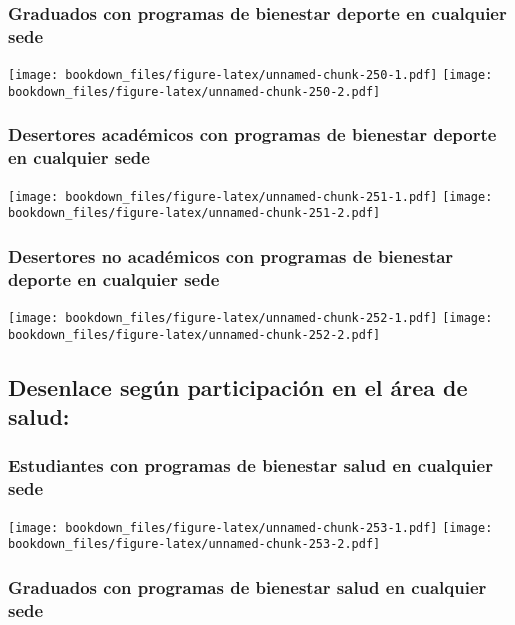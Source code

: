 \documentclass[]{article}
\theoremstyle{definition}
\theoremstyle{definition}
\theoremstyle{definition}
\theoremstyle{remark}
\begin{document}
\subsubsection{Graduados con programas de bienestar deporte en cualquier
sede}\label{graduados-con-programas-de-bienestar-deporte-en-cualquier-sede-1}

\texttt{[image: bookdown\_files/figure-latex/unnamed-chunk-250-1.pdf]}
\texttt{[image: bookdown\_files/figure-latex/unnamed-chunk-250-2.pdf]}

\subsubsection{Desertores académicos con programas de bienestar deporte
en cualquier
sede}\label{desertores-academicos-con-programas-de-bienestar-deporte-en-cualquier-sede-1}

\texttt{[image: bookdown\_files/figure-latex/unnamed-chunk-251-1.pdf]}
\texttt{[image: bookdown\_files/figure-latex/unnamed-chunk-251-2.pdf]}

\subsubsection{Desertores no académicos con programas de bienestar
deporte en cualquier
sede}\label{desertores-no-academicos-con-programas-de-bienestar-deporte-en-cualquier-sede-1}

\texttt{[image: bookdown\_files/figure-latex/unnamed-chunk-252-1.pdf]}
\texttt{[image: bookdown\_files/figure-latex/unnamed-chunk-252-2.pdf]}

\subsection{Desenlace según participación en el área de
salud:}\label{desenlace-segun-participacion-en-el-area-de-salud-2}

\subsubsection{Estudiantes con programas de bienestar salud en cualquier
sede}\label{estudiantes-con-programas-de-bienestar-salud-en-cualquier-sede-3}

\texttt{[image: bookdown\_files/figure-latex/unnamed-chunk-253-1.pdf]}
\texttt{[image: bookdown\_files/figure-latex/unnamed-chunk-253-2.pdf]}

\subsubsection{Graduados con programas de bienestar salud en cualquier
sede}\label{graduados-con-programas-de-bienestar-salud-en-cualquier-sede-3}
\end{document}
